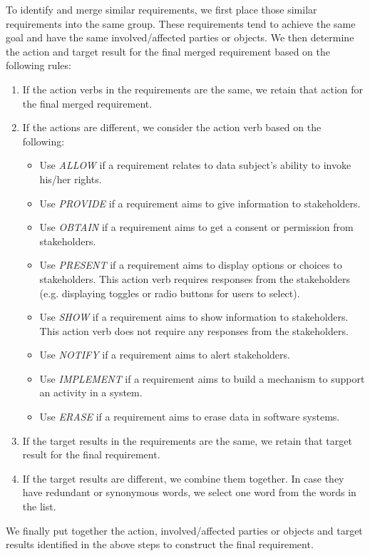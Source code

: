 To identify and merge similar requirements, we first place those similar requirements into the same group. These requirements tend to achieve the same goal and have the same involved/affected parties or objects. We then determine the action and target result for the final merged requirement based on the following rules:
\begin{enumerate}[leftmargin=*, noitemsep]
	\item If the action verbs in the requirements are the same, we retain that action for the final merged requirement.
	\item If the actions are different, we consider the action verb based on the following:
	\begin{itemize}[leftmargin=*, noitemsep]
		\item Use \emph{ALLOW} if a requirement relates to data subject's ability to invoke his/her rights.
		\item Use \emph{PROVIDE} if a requirement aims to give information to stakeholders.
		\item Use \emph{OBTAIN} if a requirement aims to get a consent or permission from stakeholders.
		\item Use \emph{PRESENT} if a requirement aims to display options or choices to stakeholders. This action verb requires responses from the stakeholders (e.g. displaying toggles or radio buttons for users to select).
		\item Use \emph{SHOW} if a requirement aims to show information to stakeholders. This action verb does not require any responses from the stakeholders.
		\item Use \emph{NOTIFY} if a requirement aims to alert stakeholders.
		\item Use \emph{IMPLEMENT} if a requirement aims to build a mechanism to support an activity in a system.
		\item Use \emph{ERASE} if a requirement aims to erase data in software systems.
	\end{itemize}
	\item If the target results in the requirements are the same, we retain that target result for the final requirement.
	\item If the target results are different, we combine them together. In case they have redundant or synonymous words, we select one word from the words in the list.
\end{enumerate}	

We finally put together the action, involved/affected parties or objects and target results identified in the above steps to construct the final requirement. 

